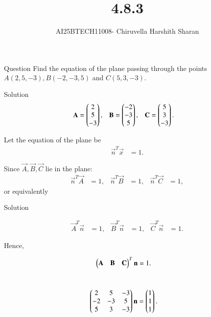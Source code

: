 \documentclass{beamer}
\title 
{4.8.3}
\author 
{AI25BTECH11008- Chiruvella Harshith Sharan}
\begin{document}
\frame{\titlepage}
\begin{frame}{Question}
Find the equation of the plane passing through the points 
$A(2, 5, -3), B(-2, -3, 5)$ and $C(5, 3, -3)$.
\end{frame}
\begin{frame}{Solution}
\begin{align}
\mathbf{A} &= \begin{pmatrix}2 \\ 5 \\ -3\end{pmatrix}, & 
\mathbf{B} &= \begin{pmatrix}-2 \\ -3 \\ 5\end{pmatrix}, & 
\mathbf{C} &= \begin{pmatrix}5 \\ 3 \\ -3\end{pmatrix}.
\end{align}

Let the equation of the plane be
\begin{align}
\vec{n}^T \vec{x} &= 1.
\end{align}

Since $\vec{A}, \vec{B}, \vec{C}$ lie in the plane:
\begin{align}
\vec{n}^T \vec{A} &= 1, & 
\vec{n}^T \vec{B} &= 1, & 
\vec{n}^T \vec{C} &= 1,
\end{align}
or equivalently
\end{frame}
\begin{frame}{Solution}

\begin{align}
\vec{A}^T \vec{n} &= 1, & 
\vec{B}^T \vec{n} &= 1, & 
\vec{C}^T \vec{n} &= 1.
\end{align}

Hence,


\begin{align}
\begin{pmatrix}\mathbf{A} & \mathbf{B} & \mathbf{C}\end{pmatrix}^{T} \mathbf{n} 
&= 1.
\end{align}
\

\begin{align}
\begin{pmatrix} 2 & 5 & -3 \\ -2 & -3 & 5 \\ 5 & 3 & -3\end{pmatrix}\mathbf{n}
&= \begin{pmatrix}1 \\ 1 \\ 1\end{pmatrix}.
\end{align}
\end{frame}
\end{document}
